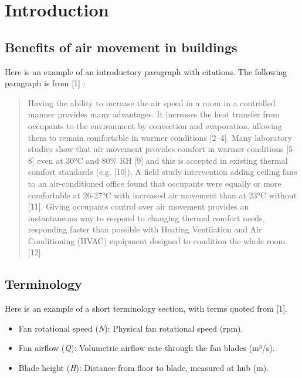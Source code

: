 \documentclass[]{elsarticle} %
\providecommand{\tightlist}{%
  \setlength{\itemsep}{0pt}\setlength{\parskip}{0pt}}
\begin{document}
\pagebreak

\section{Introduction}\label{introduction}

\subsection{Benefits of air movement in
buildings}\label{benefits-of-air-movement-in-buildings}

Here is an example of an introductory paragraph with citations. The
following paragraph is from {[}1{]} :

\begin{quote}
Having the ability to increase the air speed in a room in a controlled
manner provides many advantages. It increases the heat transfer from
occupants to the environment by convection and evaporation, allowing
them to remain comfortable in warmer conditions {[}2--4{]}. Many
laboratory studies show that air movement provides comfort in warmer
conditions {[}5--8{]} even at 30°C and 80\% RH {[}9{]} and this is
accepted in existing thermal comfort standards (e.g. {[}10{]}). A field
study intervention adding ceiling fans to an air-conditioned office
found that occupants were equally or more comfortable at 26-27°C with
increased air movement than at 23°C without {[}11{]}. Giving occupants
control over air movement provides an instantaneous way to respond to
changing thermal comfort needs, responding faster than possible with
Heating Ventilation and Air Conditioning (HVAC) equipment designed to
condition the whole room {[}12{]}.
\end{quote}

\subsection{Terminology}\label{terminology}

Here is an example of a short terminology section, with terms quoted
from {[}1{]}.

\begin{itemize}
\tightlist
\item
  Fan rotational speed (\emph{N}): Physical fan rotational speed (rpm).
\item
  Fan airflow (\emph{Q}): Volumetric airflow rate through the fan blades
  (m³/s).
\item
  Blade height (\emph{H}): Distance from floor to blade, measured at hub
  (m).
\end{itemize}
\end{document}
